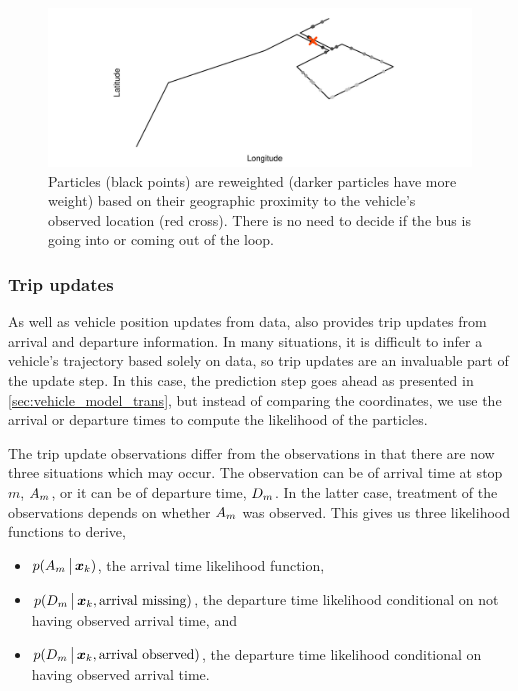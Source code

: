 \begin{knitrout}\small
{}\color{fgcolor}\begin{figure}

{\centering \includegraphics[width=\maxwidth]{figure/pf_wts-1} 

}

\caption[Particles are reweighted based on their geographic proximity to the vehicle's observed location]{Particles (black points) are reweighted (darker particles have more weight) based on their geographic proximity to the vehicle's observed location (red cross). There is no need to decide if the bus is going into or coming out of the loop.}\label{fig:pf_wts}
\end{figure}


\end{knitrout}


\subsubsection{Trip updates}
\label{sec:lhood_trip}

As well as vehicle position updates from \GPS{} data, \GTFS{} also provides trip updates from arrival and departure information. In many situations, it is difficult to infer a vehicle's trajectory based solely on \GPS{} data, so trip updates are an invaluable part of the update step. In this case, the \pf{} prediction step goes ahead as presented in \cref{sec:vehicle_model_trans}, but instead of comparing the coordinates, we use the arrival or departure times to compute the likelihood of the particles.


The trip update observations differ from the \GPS{} observations in that there are now three situations which may occur. The observation can be of arrival time at stop $m$, $A_m$, or it can be of departure time, $D_m$. In the latter case, treatment of the observations depends on whether $A_m$ was observed. This gives us three likelihood functions to derive,
\begin{itemize}
\item $p(A_m \,\big|\,{} \boldsymbol x_k)$, the arrival time likelihood function,
\item $p(D_m \,\big|\,{} \boldsymbol x_k, \text{arrival missing})$, the departure time likelihood conditional on not having observed arrival time, and
\item $p(D_m \,\big|\,{} \boldsymbol x_k, \text{arrival observed})$, the departure time likelihood conditional on having observed arrival time.
\end{itemize}


